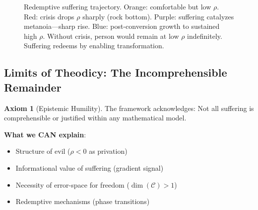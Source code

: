 \documentclass[11pt,a4paper]{article}
\theoremstyle{definition}
\newtheorem{axiom}{Axiom}[section]
\theoremstyle{remark}
\newcommand{\CC}{\mathcal{C}}
\begin{document}
\begin{enumerate}
\begin{figure}[H]
\caption{Redemptive suffering trajectory. Orange: comfortable but low \(\rho\). Red: crisis drops \(\rho\) sharply (rock bottom). Purple: suffering catalyzes metanoia—sharp rise. Blue: post-conversion growth to sustained high \(\rho\). Without crisis, person would remain at low \(\rho\) indefinitely. Suffering redeems by enabling transformation.}
\label{fig:redemptive_suffering}
\end{figure}

\subsection{Limits of Theodicy: The Incomprehensible Remainder}

\begin{axiom}[Epistemic Humility]
The framework acknowledges: Not all suffering is comprehensible or justified within any mathematical model.

\textbf{What we CAN explain}:
\begin{itemize}
    \item Structure of evil (\(\rho < 0\) as privation)
    \item Informational value of suffering (gradient signal)
    \item Necessity of error-space for freedom (\(\dim(\CC) > 1\))
    \item Redemptive mechanisms (phase transitions)
\end{itemize}


\end{axiom}
\end{enumerate}
\end{document}

